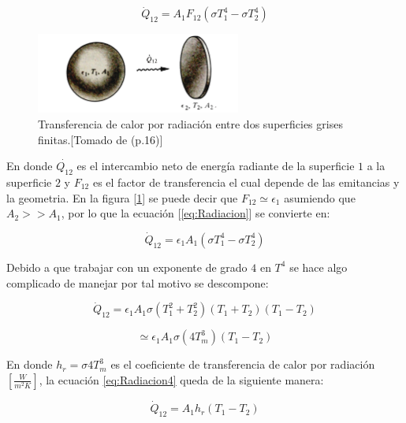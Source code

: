 \documentclass[12pt,letterpaper]{article}     %
\begin{document}
\begin{equation}
\dot Q_{12}= A_{1}F_{12} (\sigma T_{1}^{4}-\sigma T_{2}^{4})
    \label{eq:Radiacion}
\end{equation}

\begin{figure}[H]
\centering
\includegraphics[width=0.6\textwidth]{Imagines/transradiacion-nuevo.jpg}
\caption{Transferencia de calor por radiación entre dos superficies grises finitas.[Tomado de \cite{Mills} (p.16)]}
\label{fig:transradiacion}
\end{figure}


En donde $\dot{Q_{12}}$ es el intercambio neto de energía radiante de la superficie $1$ a la superficie $2$ y $F_{12}$ es el factor de transferencia el cual depende de las emitancias y la geometria. En la figura [\ref{fig:transradiacion}] se puede decir que $F_{12} \simeq \epsilon_{1}$ asumiendo que $A_{2} >> A_{1}$, por lo que la ecuación [\ref{eq:Radiacion}] se convierte en:

\begin{equation}
\dot Q_{12} = \epsilon_{1} A_{1}(\sigma T_{1}^{4}-\sigma T_{2}^{4})
    \label{eq:Radiacion2}
\end{equation}

Debido a que trabajar con un exponente de grado $4$ en $T^{4}$ se hace algo complicado de manejar por tal motivo se descompone:

\begin{equation*}
\dot Q_{12} = \epsilon_{1} A_{1}\sigma (T_{1}^{2} + T_{2}^{2})(T_{1} + T_{2})(T_{1} - T_{2})
    \label{eq:Radiacion3}
\end{equation*}

\begin{equation*}
\simeq  \epsilon_{1} A_{1}\sigma(4T_{m}^{3})(T_{1} - T_{2})
    \label{eq:Radiacion4}
\end{equation*}

En donde $h_{r} = \sigma 4T_{m}^{3} $ es el coeficiente de transferencia de calor por radiación $[\frac{W}{m^2K}]$, la ecuación \ref{eq:Radiacion4} queda de la siguiente manera:

\begin{equation}
\dot Q_{12} = A_{1} h_{r} (T_{1} - T_{2})
    \label{eq:Radiacion5}
\end{equation}
\end{document}
